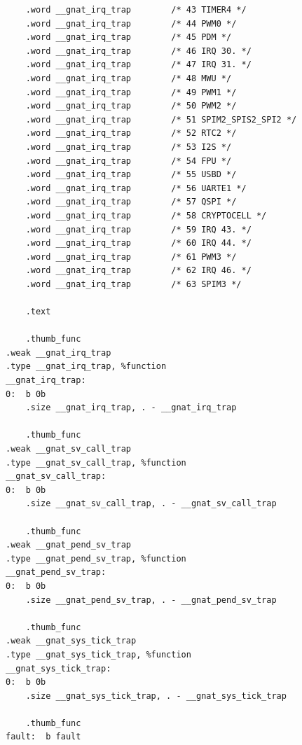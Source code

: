 \documentclass{article}
\begin{document}
\begin{lstlisting}
	.word __gnat_irq_trap        /* 43 TIMER4 */
	.word __gnat_irq_trap        /* 44 PWM0 */
	.word __gnat_irq_trap        /* 45 PDM */
	.word __gnat_irq_trap        /* 46 IRQ 30. */
	.word __gnat_irq_trap        /* 47 IRQ 31. */
	.word __gnat_irq_trap        /* 48 MWU */
	.word __gnat_irq_trap        /* 49 PWM1 */
	.word __gnat_irq_trap        /* 50 PWM2 */
	.word __gnat_irq_trap        /* 51 SPIM2_SPIS2_SPI2 */
	.word __gnat_irq_trap        /* 52 RTC2 */
	.word __gnat_irq_trap        /* 53 I2S */
	.word __gnat_irq_trap        /* 54 FPU */
	.word __gnat_irq_trap        /* 55 USBD */
	.word __gnat_irq_trap        /* 56 UARTE1 */
	.word __gnat_irq_trap        /* 57 QSPI */
	.word __gnat_irq_trap        /* 58 CRYPTOCELL */
	.word __gnat_irq_trap        /* 59 IRQ 43. */
	.word __gnat_irq_trap        /* 60 IRQ 44. */
	.word __gnat_irq_trap        /* 61 PWM3 */
	.word __gnat_irq_trap        /* 62 IRQ 46. */
	.word __gnat_irq_trap        /* 63 SPIM3 */

	.text

	.thumb_func
.weak __gnat_irq_trap
.type __gnat_irq_trap, %function
__gnat_irq_trap:
0:	b 0b
	.size __gnat_irq_trap, . - __gnat_irq_trap

	.thumb_func
.weak __gnat_sv_call_trap
.type __gnat_sv_call_trap, %function
__gnat_sv_call_trap:
0:	b 0b
	.size __gnat_sv_call_trap, . - __gnat_sv_call_trap

	.thumb_func
.weak __gnat_pend_sv_trap
.type __gnat_pend_sv_trap, %function
__gnat_pend_sv_trap:
0:	b 0b
	.size __gnat_pend_sv_trap, . - __gnat_pend_sv_trap

	.thumb_func
.weak __gnat_sys_tick_trap
.type __gnat_sys_tick_trap, %function
__gnat_sys_tick_trap:
0:	b 0b
	.size __gnat_sys_tick_trap, . - __gnat_sys_tick_trap

	.thumb_func
fault:	b fault
\end{lstlisting}


\end{document}
